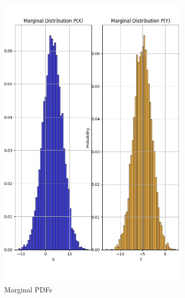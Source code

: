 \documentclass{article}
\begin{document}
\begin{figure}[H]
  \centering
  \begin{subfigure}{0.45\textwidth}
    \centering
    \includegraphics[width=\linewidth]{results/section2/b(1).png}
    \caption{Marginal PDFs}
  \end{subfigure}
  \hfill
  \begin{subfigure}{0.45\textwidth}

\end{subfigure}
\end{figure}
\end{document}
